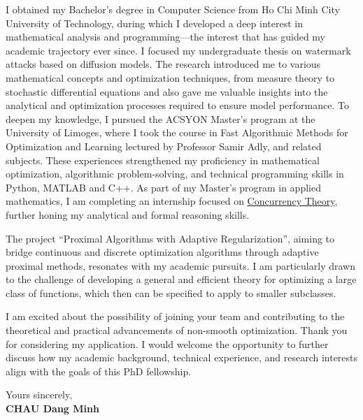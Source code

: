 \documentclass[11pt]{report}
\begin{document}
\begin{titlepage}
    I obtained my Bachelor's degree in Computer Science from Ho Chi Minh City University of Technology, during which I developed a deep interest in mathematical analysis and programming---the interest that has guided my academic trajectory ever since. I focused my undergraduate thesis on watermark attacks based on diffusion models. The research introduced me to various mathematical concepts and optimization techniques, from measure theory to stochastic differential equations and also gave me valuable insights into the analytical and optimization processes required to ensure model performance. To deepen my knowledge, I pursued the ACSYON Master’s program at the University of Limoges, where I took the course in Fast Algorithmic Methods for Optimization and Learning lectured by Professor Samir Adly, and related subjects. These experiences strengthened my proficiency in mathematical optimization, algorithmic problem-solving, and technical programming skills in Python, MATLAB and C++. As part of my Master’s program in applied mathematics,  I am completing an internship focused on \href{https://www.telecom-paris.fr/wp-content-EvDsK19/uploads/2023/12/Master-Internship_Ameur-Boulifa-Ramea_Open-Automata.pdf}{Concurrency Theory}, further honing my analytical and formal reasoning skills.

    \vspace{0.7em}

    The project ``Proximal Algorithms with Adaptive Regularization'', aiming to bridge continuous and discrete optimization algorithms through adaptive
    proximal methods, resonates with my academic pursuits. I am particularly drawn to the challenge of developing a general and efficient theory for optimizing a large class of functions, which then can be specified to apply to smaller subclasses.

    \vspace{0.7em}

    I am excited about the possibility of joining your team and contributing to the theoretical and practical advancements of non-smooth optimization. Thank you for considering my application. I would welcome the opportunity to further discuss how my academic background, technical experience, and research interests align with the goals of this PhD fellowship.

    \vspace{0.7em}

    Yours sincerely,\\
    \textbf{CHAU Dang Minh}

\end{titlepage}
\end{document}

